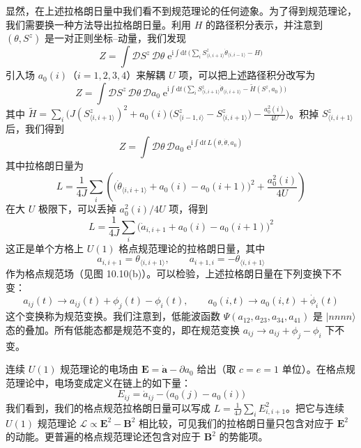 显然，在上述拉格朗日量中我们看不到规范理论的任何迹象。为了得到规范理论，我们需要换一种方法导出拉格朗日量。利用 $H$ 的路径积分表示，并注意到 $(\theta,S^{z})$ 是一对正则坐标--动量，我们发现
\begin{equation*}
Z=\int\mathcal{D}S^{z}\,\mathcal{D}\theta\;\mathrm{e}^{\mathrm{i}\int\mathrm{d}t\,\big(\sum_{i}S_{\langle i,i+1\rangle}^{z}\dot\theta_{\langle i,i-1\rangle}-H\big)}
\end{equation*}
引入场 $a_0(i)$（$i=1,2,3,4$）来解耦 $U$ 项，可以把上述路径积分改写为
\begin{equation*}
Z=\int\mathcal{D}S^{z}\,\mathcal{D}\theta\,\mathcal{D}a_0\;\mathrm{e}^{\mathrm{i}\int\mathrm{d}t\,\big(\sum_{i}S_{\langle i,i+1\rangle}^{z}\dot\theta_{\langle i,i+1\rangle}-\tilde H(S^{z},a_0)\big)}
\end{equation*}
其中 $\tilde H=\sum_{i}\Big(J(S_{\langle i,i+1\rangle}^{z})^{2}+a_0(i)\big(S_{\langle i-1,i\rangle}^{z}-S_{\langle i,i+1\rangle}^{z}\big)-\frac{a_0^{2}(i)}{4U}\Big)$。积掉 $S_{\langle i,i+1\rangle}^{z}$ 后，我们得到
\begin{equation*}
Z=\int\mathcal{D}\theta\,\mathcal{D}a_0\;\mathrm{e}^{\mathrm{i}\int\mathrm{d}t\,L(\theta,\dot\theta,a_0)}
\end{equation*}
其中拉格朗日量为
\begin{equation*}
L=\frac{1}{4J}\sum_{i}\left(\big(\dot\theta_{\langle i,i+1\rangle}+a_0(i)-a_0(i+1)\big)^{2}+\frac{a_0^{2}(i)}{4U}\right)
\end{equation*}
在大 $U$ 极限下，可以丢掉 $a_0^{2}(i)/4U$ 项，得到
\begin{equation*}
L=\frac{1}{4J}\sum_{i}\big(\dot a_{i,i+1}+a_0(i)-a_0(i+1)\big)^{2}
\end{equation*}
这正是单个方格上 $U(1)$ 格点规范理论的拉格朗日量，其中
\begin{equation*}
a_{i,i+1}=\theta_{\langle i,i+1\rangle}, \qquad a_{i+1,i}=-\theta_{\langle i,i+1\rangle}
\end{equation*}
作为格点规范场（见图 10.10(b)）。可以检验，上述拉格朗日量在下列变换下不变：
\begin{equation*}
a_{ij}(t)\to a_{ij}(t)+\phi_{j}(t)-\phi_{i}(t), \qquad a_0(i,t)\to a_0(i,t)+\dot\phi_{i}(t) \tag{10.6.2}
\end{equation*}
这个变换称为规范变换。我们注意到，低能波函数 $\Psi(a_{12},a_{23},a_{34},a_{41})$ 是 $|nnnn\rangle$ 态的叠加。所有低能态都是规范不变的，即在规范变换 $a_{ij}\to a_{ij}+\phi_{j}-\phi_{i}$ 下不变。

连续 $U(1)$ 规范理论的电场由 $\pmb{E}=\pmb{\dot a}-\partial a_{0}$ 给出（取 $c=e=1$ 单位）。在格点规范理论中，电场变成定义在链上的如下量：
\begin{equation*}
E_{ij}=\dot a_{ij}-\big(a_0(j)-a_0(i)\big)
\end{equation*}
我们看到，我们的格点规范拉格朗日量可以写成 $L=\frac{1}{4J}\sum_{i}E_{i,i+1}^{2}$。把它与连续 $U(1)$ 规范理论 $\mathcal{L}\propto\pmb{E}^{2}-\pmb{B}^{2}$ 相比较，可见我们的拉格朗日量只包含对应于 $\pmb{E}^{2}$ 的动能。更普遍的格点规范理论还包含对应于 $\pmb{B}^{2}$ 的势能项。

